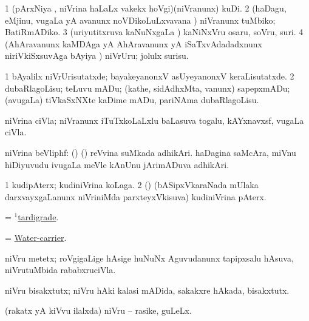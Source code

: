 \noindent 
\gl{\akirx}
\expl{}
\bmng
\bnum
\num{1} (pArxNiya \vi, niVrina haLaLx \mo vakekx hoVgi)(niVranunx) kuDi. 
\num{2} (haDagu, eMjinu, \mo vugaLa yA avanunx noVDikoLuLxvavana \vi) niVranunx tuMbiko; BatiRmADiko. 
\num{3} (uriyutitxruva kaNuNxgaLa \vi) kaNiNxVru osaru, soVru, suri. 
\num{4} (AhAravanunx kaMDAga yA AhAravanunx yA iSaTxvAdadadxnunx niriVkiSxsuvAga bAyiya \vi) niVrUru; jolulx surisu. 
\enum
\emng

\noindent 
\gl{\pagu}
\expl{}
\bmng
\bnum
\num{1}  bAyalilx niVrUrisutatxde; bayakeyanonxV asUyeyanonxV keraLisutatxde. 
\num{2}  dubaRlagoLisu; teLuvu mADu; (kathe, sidAdhxMta, \mo vanunx) sapepxmADu; (avugaLa) tiVkaSxNXte kaDime mADu, pariNAma dubaRlagoLisu. 
\enum
\emng
\eentry

\bentry
{} 
\gl{\nA}
\expl{}
\bmng
niVrina ciVla; niVranunx iTuTxkoLaLxlu baLasuva togalu, kAYxnavxsf, \mo vugaLa ciVla. 
\emng
\eentry

\bentry
{} 
\gl{\nA}
\expl{}
\bmng
niVrina beVliphf: 
\banum
{} (\birx) (\ca) reVvina suMkada adhikAri. 
 haDagina saMcAra, miVnu hiDiyuvudu ivugaLa meVle kAnUnu jArimADuva adhikAri. 
\eanum
\emng
\eentry

\bentry
{} 
\gl{\nA}
\expl{}
\bmng
\bnum
\num{1} kudipAterx; kudiniVrina koLaga. 
\num{2} (\ravi) (bASipxVkaraNada mUlaka darxvayxgaLanunx niVriniMda parxteyxVkisuva) kudiniVrina pAterx. 
\enum
\emng
\eentry

\bentry
{} 
\gl{\nA}
\expl{}
\bmng
= \hyperref{kandict_t.pdf}{T}{tardigrade(1)}{$^1$tardigrade}. 
\emng
\eentry

\bentry
{} 
\gl{\nA}
\expl{}
\bmng
= \hyperlink{Water-carrier}{Water-carrier}. 
\emng
\eentry

\bentry 
{} 
\gl{\nA}
\expl{}
\bmng
niVru metetx; roVgigaLige hAsige huNuNx Aguvudanunx tapipxsalu hAsuva, niVrutuMbida rababxruciVla. 
\emng
\eentry

\bentry
{} 
\gl{\nA}
\expl{}
\bmng
niVru bisakxtutx; niVru hAki kalasi mADida, sakakxre hAkada, bisakxtutx. 
\emng
\eentry

\bentry
{} 
\gl{\nA}
\expl{}
\bmng
(rakatx yA kiVvu ilalxda) niVru -- rasike, guLeLx. 
\emng
\eentry

